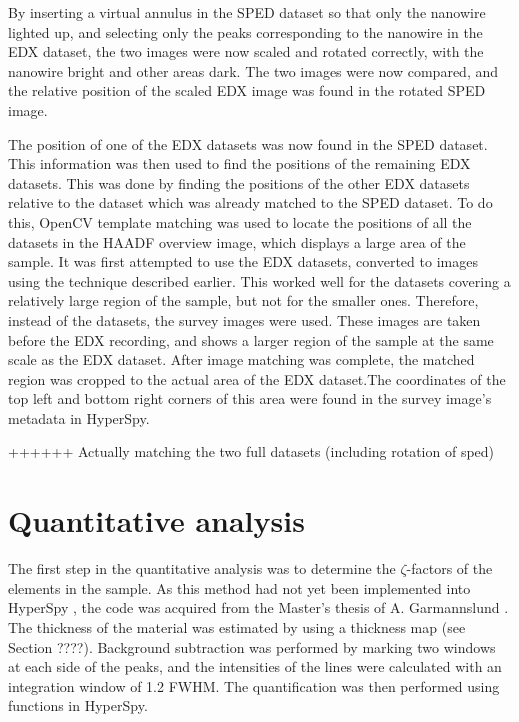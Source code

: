 By inserting a virtual annulus in the SPED dataset so that only the nanowire lighted up, and selecting only the peaks corresponding to the nanowire in the EDX dataset, the two images were now scaled and rotated correctly, with the nanowire bright and other areas dark.
The two images were now compared, and the relative position of the scaled EDX image was found in the rotated SPED image.

The position of one of the EDX datasets was now found in the SPED dataset. This information was then used to find the positions of the remaining EDX datasets. This was done by finding the positions of the other EDX datasets relative to the dataset which was already matched  to the SPED dataset. To do this, OpenCV template matching was used to locate the positions of all the datasets in the HAADF overview image, which displays a large area of the sample. It was first attempted to use the EDX datasets, converted to images using the technique described earlier. This worked well for the datasets covering a relatively large region of the sample, but not for the smaller ones. Therefore, instead of the datasets, the survey images were used. These images are taken before the EDX recording, and shows a larger region of the sample at the same scale as the EDX dataset. After image matching was complete, the matched region was cropped to the actual area of the EDX dataset.The coordinates of the top left and bottom right corners of this area were found in the survey image's metadata in HyperSpy.

++++++ Actually matching the two full datasets (including rotation of sped)

\section{Quantitative analysis}

The first step in the quantitative analysis was to determine the $\zeta$-factors of the elements in the sample. As this method had not yet been implemented into HyperSpy \cite{hyperspy}, the code was acquired from the Master's thesis of A. Garmannslund \cite{andreas}. The thickness of the material was estimated by using a thickness map (see Section ????). Background subtraction was performed by marking two windows at each side of the peaks, and the intensities of the lines were calculated with an integration window of 1.2 FWHM. The quantification was then performed using functions in HyperSpy. 